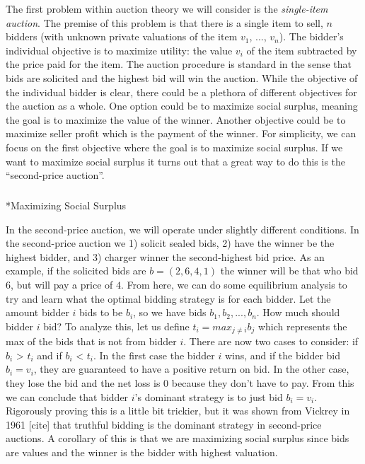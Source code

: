 \documentclass[
  letterpaper,
  numbers=noenddot,
  DIV=11]{scrreprt}
\makeatletter
\let\oldsubparagraph\subparagraph
\renewcommand{\subparagraph}{
    \@ifstar
      \xxxSubParagraphStar
      \xxxSubParagraphNoStar
  }
\newcommand{\xxxSubParagraphStar}[1]{\oldsubparagraph*{#1}\mbox{}}
\newcommand{\xxxSubParagraphNoStar}[1]{\oldsubparagraph{#1}\mbox{}}
\theoremstyle{definition}
\theoremstyle{plain}
\theoremstyle{plain}
\theoremstyle{remark}
\makeatother
\begin{document}
The first problem within auction theory we will consider is the
\emph{single-item auction}. The premise of this problem is that there is
a single item to sell, \(n\) bidders (with unknown private valuations of
the item \(v_1\), ..., \(v_n\)). The bidder's individual objective is to
maximize utility: the value \(v_i\) of the item subtracted by the price
paid for the item. The auction procedure is standard in the sense that
bids are solicited and the highest bid will win the auction. While the
objective of the individual bidder is clear, there could be a plethora
of different objectives for the auction as a whole. One option could be
to maximize social surplus, meaning the goal is to maximize the value of
the winner. Another objective could be to maximize seller profit which
is the payment of the winner. For simplicity, we can focus on the first
objective where the goal is to maximize social surplus. If we want to
maximize social surplus it turns out that a great way to do this is the
``second-price auction''.

\subparagraph*{Maximizing Social
Surplus}\label{maximizing-social-surplus}

In the second-price auction, we will operate under slightly different
conditions. In the second-price auction we 1) solicit sealed bids, 2)
have the winner be the highest bidder, and 3) charger winner the
second-highest bid price. As an example, if the solicited bids are
\(b = (2, 6, 4, 1)\) the winner will be that who bid \(6\), but will pay
a price of \(4\). From here, we can do some equilibrium analysis to try
and learn what the optimal bidding strategy is for each bidder. Let the
amount bidder \(i\) bids to be \(b_i\), so we have bids
\(b_1, b_2, ..., b_n\). How much should bidder \(i\) bid? To analyze
this, let us define \(t_i = max_{j \neq i} b_j\) which represents the
max of the bids that is not from bidder \(i\). There are now two cases
to consider: if \(b_i\) \textgreater{} \(t_i\) and if \(b_i\)
\textless{} \(t_i\). In the first case the bidder \(i\) wins, and if the
bidder bid \(b_i = v_i\), they are guaranteed to have a positive return
on bid. In the other case, they lose the bid and the net loss is 0
because they don't have to pay. From this we can conclude that bidder
\(i\)'s dominant strategy is to just bid \(b_i = v_i\). Rigorously
proving this is a little bit trickier, but it was shown from Vickrey in
1961 {[}cite{]} that truthful bidding is the dominant strategy in
second-price auctions. A corollary of this is that we are maximizing
social surplus since bids are values and the winner is the bidder with
highest valuation.
\end{document}
